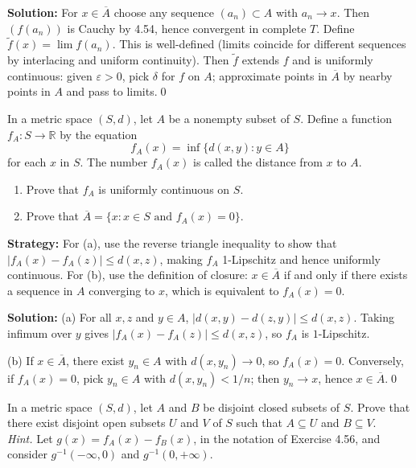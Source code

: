 \bigskip\noindent\textbf{Solution:}
For $x\in\overline{A}$ choose any sequence $(a_n)\subset A$ with $a_n\to x$. Then $(f(a_n))$ is Cauchy by 4.54, hence convergent in complete $T$. Define $\tilde f(x)=\lim f(a_n)$. This is well-defined (limits coincide for different sequences by interlacing and uniform continuity). Then $\tilde f$ extends $f$ and is uniformly continuous: given $\varepsilon>0$, pick $\delta$ for $f$ on $A$; approximate points in $\overline{A}$ by nearby points in $A$ and pass to limits.\qed



\begin{problembox}
In a metric space $(S, d)$, let $A$ be a nonempty subset of $S$. Define a function $f_A : S \to \mathbb{R}$ by the equation
\[f_A(x) = \inf \{d(x, y) : y \in A\}\]
for each $x$ in $S$. The number $f_A(x)$ is called the distance from $x$ to $A$.
\begin{enumerate}[label=(\alph*)]
\item Prove that $f_A$ is uniformly continuous on $S$.
\item Prove that $\overline{A} = \{x : x \in S \text{ and } f_A(x) = 0\}$.
\end{enumerate}
\end{problembox}

\noindent\textbf{Strategy:} For (a), use the reverse triangle inequality to show that $|f_A(x) - f_A(z)| \leq d(x,z)$, making $f_A$ 1-Lipschitz and hence uniformly continuous. For (b), use the definition of closure: $x \in \overline{A}$ if and only if there exists a sequence in $A$ converging to $x$, which is equivalent to $f_A(x) = 0$.

\bigskip\noindent\textbf{Solution:}
(a) For all $x,z$ and $y\in A$, $|d(x,y)-d(z,y)|\le d(x,z)$. Taking infimum over $y$ gives $|f_A(x)-f_A(z)|\le d(x,z)$, so $f_A$ is $1$-Lipschitz.

(b) If $x\in\overline{A}$, there exist $y_n\in A$ with $d(x,y_n)\to 0$, so $f_A(x)=0$. Conversely, if $f_A(x)=0$, pick $y_n\in A$ with $d(x,y_n)<1/n$; then $y_n\to x$, hence $x\in\overline{A}$.\qed



\begin{problembox}
In a metric space $(S, d)$, let $A$ and $B$ be disjoint closed subsets of $S$. Prove that there exist disjoint open subsets $U$ and $V$ of $S$ such that $A \subseteq U$ and $B \subseteq V$. \\
\textit{Hint.} Let $g(x) = f_A(x) - f_B(x)$, in the notation of Exercise 4.56, and consider $g^{-1}(-\infty, 0)$ and $g^{-1}(0, +\infty)$.
\end{problembox}

